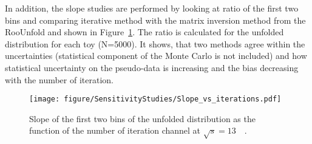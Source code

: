 In addition, the slope studies are performed by looking at ratio of the first two bins and comparing iterative method with the matrix inversion method from the \textsf{RooUnfold} and shown in Figure~\ref{fig:slope}. The ratio is calculated for the unfolded distribution for each toy (N=5000). It shows, that two methods agree within the uncertainties (statistical component of the Monte Carlo is not included) and how statistical uncertainty on the pseudo-data is increasing and the bias decreasing with the number of iteration.
\begin{figure}[h]
\centering
\texttt{[image: figure/SensitivityStudies/Slope\_vs\_iterations.pdf]}
\caption{Slope of the first two bins of the unfolded distribution as the function of the number of iteration \Wmenu channel at $\sqrt{s} = 13$~\TeV\ . }
\label{fig:slope}
\end{figure}
